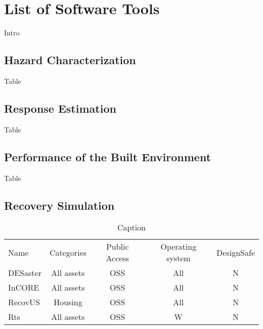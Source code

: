 %
%
%

\chapter{List of Software Tools}
\label{tools_list} %

Intro

\section{Hazard Characterization}
\label{sec:tools_list_hazard}
Table

\section{Response Estimation}
\label{sec:tools_list_response}

Table

\section{Performance of the Built Environment}
\label{sec:tools_list_performance}

Table

\section{Recovery Simulation}

\label{sec:tools_list_recovery}
\begin{table}[]
    \centering
    \begin{tabular}{l|cccc}
    \toprule
    Name & Categories & Public Access & Operating system & DesignSafe \\
    DESaster & All assets & OSS & All & N \\
    InCORE & All assets & OSS & All & N \\
    RecovUS & Housing & OSS & All & N \\
    Rts & All assets & OSS & W & N \\
    \bottomrule
    \end{tabular}
    \caption{Caption}
    \label{tab:my_label}
\end{table}

